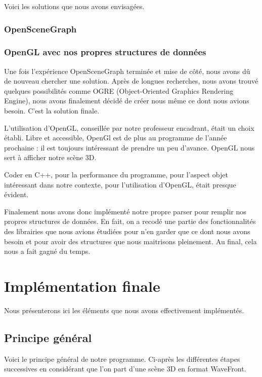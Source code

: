 \documentclass[a4paper,12pt]{report}
\begin{document}
Voici les solutions que nous avons envisagées.
 
\subsection{OpenSceneGraph}

\subsection{OpenGL avec nos propres structures de données}

Une fois l'expérience OpenSceneGraph terminée et mise de côté, nous avons dû de nouveau chercher une solution. Après de longues recherches, nous avons trouvé quelques possibilités comme OGRE (Object-Oriented Graphics Rendering Engine), nous avons finalement décidé de créer nous même ce dont nous avions besoin. C'est la solution finale.

L'utilisation d'OpenGL, conseillée par notre professeur encadrant, était un choix établi. Libre et accessible, OpenGl est de plus au programme de l'année prochaine : il est toujours intéressant de prendre un peu d'avance. OpenGL nous sert à afficher notre scène 3D.

Coder en C++, pour la performance du programme, pour l'aspect objet intéressant dans notre contexte, pour l'utilisation d'OpenGL, était presque évident.

Finalement nous avons donc implémenté notre propre parser pour remplir nos propres structures de données. En fait, on a recodé une partie des fonctionnalités des librairies que nous avions étudiées pour n'en garder que ce dont nous avons besoin et pour avoir des structures que nous maitrisons pleinement. Au final, cela nous a fait gagné du temps.


\chapter{Implémentation finale}

Nous présenterons ici les éléments que nous avons effectivement implémentés.

\section{Principe général}

Voici le principe général de notre programme. Ci-après les différentes étapes successives en considérant que l'on part d'une scène 3D en format WaveFront.
\end{document}
